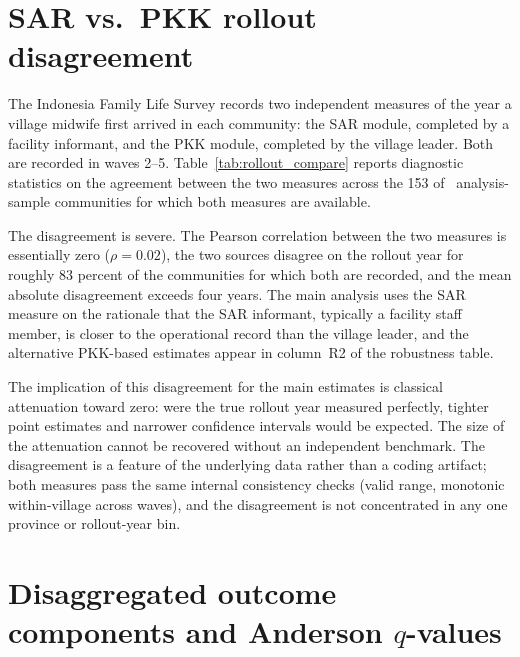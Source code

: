 
\section{SAR vs.\ PKK rollout disagreement}
\label{app:rollout}

The Indonesia Family Life Survey records two independent measures of the year a village midwife first arrived in each community: the SAR module, completed by a facility informant, and the PKK module, completed by the village leader.
Both are recorded in waves 2--5.
Table~\ref{tab:rollout_compare} reports diagnostic statistics on the agreement between the two measures across the 153 of \NVillages~analysis-sample communities for which both measures are available.

\begin{table}[!htbp]
\centering
\caption{SAR vs.\ PKK rollout-year agreement.}
\label{tab:rollout_compare}

\end{table}

The disagreement is severe.
The Pearson correlation between the two measures is essentially zero ($\rho = 0.02$), the two sources disagree on the rollout year for roughly 83 percent of the communities for which both are recorded, and the mean absolute disagreement exceeds four years.
The main analysis uses the SAR measure on the rationale that the SAR informant, typically a facility staff member, is closer to the operational record than the village leader, and the alternative PKK-based estimates appear in column~R2 of the robustness table.

The implication of this disagreement for the main estimates is classical attenuation toward zero: were the true rollout year measured perfectly, tighter point estimates and narrower confidence intervals would be expected.
The size of the attenuation cannot be recovered without an independent benchmark.
The disagreement is a feature of the underlying data rather than a coding artifact; both measures pass the same internal consistency checks (valid range, monotonic within-village across waves), and the disagreement is not concentrated in any one province or rollout-year bin.

\section{Disaggregated outcome components and Anderson $q$-values}
\label{app:anderson}

